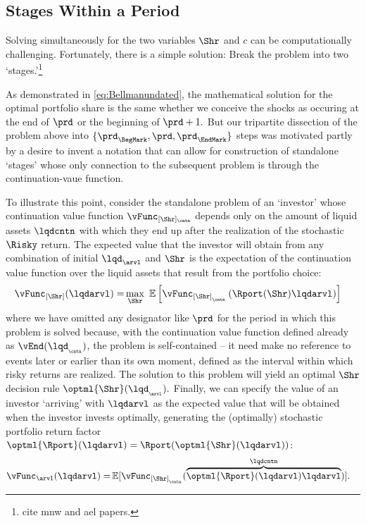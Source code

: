 \hypertarget{stages-within-a-period}{}
\subsection{Stages Within a Period}\label{subsec:stageswithin}


Solving simultaneously for the two variables $\Shr$ and ${c}$ can be computationally challenging.  Fortunately, there is a simple solution: Break the problem into two `stages.'\footnote{cite mnw and ael papers.}

As demonstrated in \eqref{eq:Bellmanundated}, the mathematical solution for the optimal portfolio share is the same whether we conceive the shocks as occuring at the end of $\prd$ or the beginning of $\prd+1.$  But our tripartite dissection of the problem above into $\{\prd_{\BegMark},\prd,\prd_{\EndMark}\}$ steps was motivated partly by a desire to invent a notation that can allow for construction of standalone `stages' whose only connection to the subsequent problem is through the continuation-vaue function.

To illustrate this point, consider the standalone problem of an `investor' whose continuation value function $\vFunc_{[\Shr]_\cntn}$ depends only on the amount of liquid assets $\lqdcntn$ with which they end up after the realization of the stochastic $\Risky$ return.  The expected value that the investor will obtain from any combination of initial $\lqd_{\arvl}$ and $\Shr$ is the expectation of the continuation value function over the liquid assets that result from the portfolio choice:
\begin{equation}\begin{gathered}\begin{aligned}
      \vFunc_{[\Shr]}({\lqdarvl})
      = & \max_{\Shr}~ \Ex\left[        \vFunc_{[\Shr]_{_\cntn}}\left(\Rport(\Shr){\lqdarvl}        \right)
      \right] \label{eq:vMidStgShr}
    \end{aligned}\end{gathered}\end{equation}
where we have omitted any designator like $\prd$ for the period in which this problem is solved because, with the continuation value function defined already as $\vEnd({\lqd}_{_\cntn})$, the problem is self-contained -- it need make no reference to events later or earlier than its own moment, defined as the interval within which risky returns are realized.  The solution to this problem will yield an optimal $\Shr$ decision rule $\optml{\Shr}(\lqd_{_\arvl}).$  Finally, we can specify the value of an investor `arriving' with $\lqdarvl$ as the expected value that will be obtained when the investor invests optimally, generating the (optimally) stochastic portfolio return factor $\optml{\Rport}(\lqdarvl)=\Rport(\optml{\Shr}(\lqdarvl))$:
\begin{equation}\begin{gathered}\begin{aligned}
      \vFunc_{\arvl}({\lqdarvl})  = & \Ex[\vFunc_{[\Shr]_{_\cntn}}(\overbrace{
        \optml{\Rport}(\lqdarvl){\lqdarvl}}^{\lqdcntn})].
    \end{aligned}\end{gathered}\end{equation}

